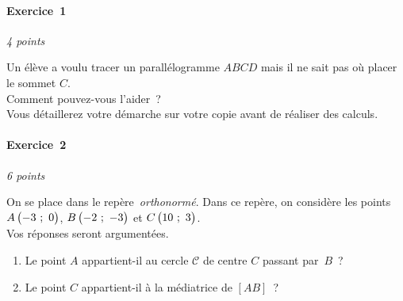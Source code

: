 \begin{minipage}{0.45\textwidth}
\thispagestyle{sujet2}

\vspace*{1em}

\paragraph{Exercice~1} \hfill \emph{4 points}

Un élève a voulu tracer un parallélogramme $ABCD$ mais il ne sait pas où placer le sommet $C$.\\ Comment pouvez-vous l'aider~?\\ Vous détaillerez votre démarche sur votre copie avant de réaliser des calculs.

\begin{center}


\end{center}


\vspace*{2em}

\paragraph{Exercice~2} \hfill \emph{6 points}

On se place dans le repère~\emph{orthonormé}. Dans ce repère, on considère les points $A\begin{pmatrix}-3~;~0\end{pmatrix}$, $B\begin{pmatrix}-2~;~-3\end{pmatrix}$ et $C\begin{pmatrix}10~;~3\end{pmatrix}$.\\Vos réponses seront argumentées.

	\begin{enumerate}
		\item Le point $A$ appartient-il au cercle $\mathscr{C}$ de centre $C$ passant par~$B$~?
		\item Le point $C$ appartient-il à la médiatrice de $\left[AB\right]$~?
	\end{enumerate}



\vspace{-2em}


\end{minipage}
\newpage

